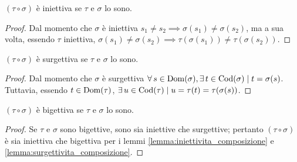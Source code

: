 \begin{lemma}
    \label{lemma:iniettivita_composizione}
    $(\tau \circ \sigma)$ è iniettiva se $\tau$ e $\sigma$ lo sono.
\end{lemma}

\begin{proof}
    Dal momento che $\sigma$ è iniettiva $s_1 \neq s_2 \implies \sigma(s_1) \neq \sigma(s_2)$,
    ma a sua volta, essendo $\tau$ iniettiva, $\sigma(s_1) \neq \sigma(s_2) \implies
        \tau(\sigma(s_1)) \neq \tau(\sigma(s_2))$.
\end{proof}

\begin{lemma}
    \label{lemma:surgettivita_composizione}
    $(\tau \circ \sigma)$ è surgettiva se $\tau$ e $\sigma$ lo sono.
\end{lemma}

\begin{proof}
    Dal momento che $\sigma$ è surgettiva $\forall s \in \Dom(\sigma),
        \exists t \in \Codom(\sigma) \mid t = \sigma(s)$. Tuttavia, essendo $t \in \operatorname{Dom}(\tau)$,
    $\exists u \in \Codom(\tau) \mid u = \tau(t) = \tau(\sigma(s))$.
\end{proof}

\begin{lemma}
    $(\tau \circ \sigma)$ è bigettiva se $\tau$ e $\sigma$ lo sono.
\end{lemma}

\begin{proof}
    Se $\tau$ e $\sigma$ sono bigettive, sono sia iniettive che surgettive;
    pertanto $(\tau \circ \sigma)$ è sia iniettiva che bigettiva per i
    lemmi \ref{lemma:iniettivita_composizione} e
    \ref{lemma:surgettivita_composizione}.
\end{proof}

